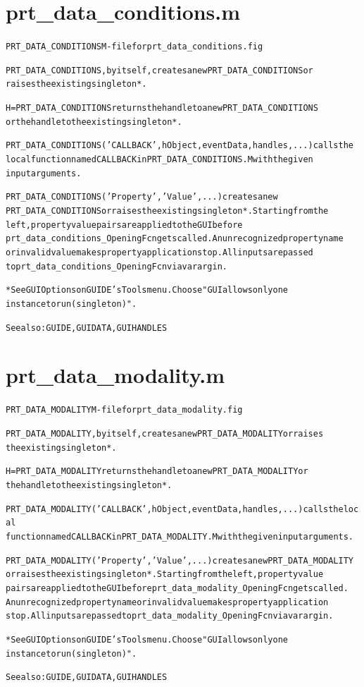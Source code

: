 \section{prt\_data\_conditions.m}
\begin{alltt}

 PRT\_DATA\_CONDITIONS M-file for prt\_data\_conditions.fig
 
 PRT\_DATA\_CONDITIONS, by itself, creates a new PRT\_DATA\_CONDITIONS or 
 raises the existing singleton*.
 
 H = PRT\_DATA\_CONDITIONS returns the handle to a new PRT\_DATA\_CONDITIONS 
 or the handle to the existing singleton*.
 
 PRT\_DATA\_CONDITIONS('CALLBACK',hObject,eventData,handles,...) calls the 
 local function named CALLBACK in PRT\_DATA\_CONDITIONS.M with the given 
 input arguments.
 
 PRT\_DATA\_CONDITIONS('Property','Value',...) creates a new 
 PRT\_DATA\_CONDITIONS or raises the existing singleton*.  Starting from the
 left, property value pairs are applied to the GUI before 
 prt\_data\_conditions\_OpeningFcn gets called.  An unrecognized property name
 or invalid value makes property application stop.  All inputs are passed 
 to prt\_data\_conditions\_OpeningFcn via varargin.
 
 *See GUI Options on GUIDE's Tools menu.  Choose "GUI allows only one
  instance to run (singleton)".
 
 See also: GUIDE, GUIDATA, GUIHANDLES
\end{alltt}


\section{prt\_data\_modality.m}
\begin{alltt}

 PRT\_DATA\_MODALITY M-file for prt\_data\_modality.fig
 
 PRT\_DATA\_MODALITY, by itself, creates a new PRT\_DATA\_MODALITY or raises 
 the existing singleton*.
 
 H = PRT\_DATA\_MODALITY returns the handle to a new PRT\_DATA\_MODALITY or 
 the handle to the existing singleton*.
 
 PRT\_DATA\_MODALITY('CALLBACK',hObject,eventData,handles,...) calls the local
 function named CALLBACK in PRT\_DATA\_MODALITY.M with the given input arguments.
 
 PRT\_DATA\_MODALITY('Property','Value',...) creates a new PRT\_DATA\_MODALITY
 or raises the existing singleton*.  Starting from the left, property value
 pairs are applied to the GUI before prt\_data\_modality\_OpeningFcn gets called.  
 An unrecognized property name or invalid value makes property application
 stop.  All inputs are passed to prt\_data\_modality\_OpeningFcn via varargin.
 
 *See GUI Options on GUIDE's Tools menu.  Choose "GUI allows only one
  instance to run (singleton)".
 
 See also: GUIDE, GUIDATA, GUIHANDLES
\end{alltt}


